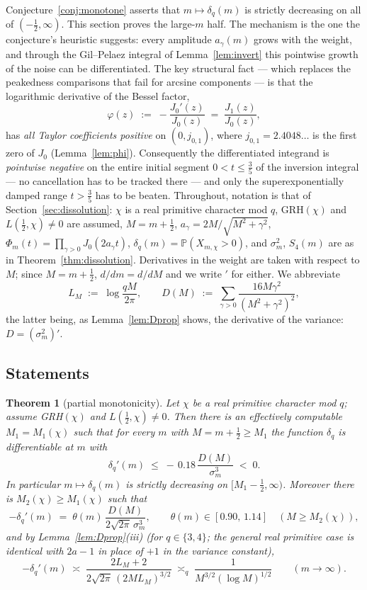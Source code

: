 \documentclass[11pt]{article}
\newtheorem{theorem}{Theorem}
\begin{document}
Conjecture~\ref{conj:monotone} asserts that $m\mapsto\delta_q(m)$ is
strictly decreasing on all of $(-\tfrac12,\infty)$. This section proves
the large-$m$ half. The mechanism is the one the conjecture's
heuristic suggests: every amplitude $a_\gamma(m)$ grows with the
weight, and through the Gil--Pelaez integral of
Lemma~\ref{lem:invert} this pointwise growth of the noise can be
differentiated. The key structural fact --- which replaces the
peakedness comparisons that fail for arcsine components --- is that
the logarithmic derivative of the Bessel factor,
\[
\varphi(z)\;:=\;-\frac{J_0'(z)}{J_0(z)}\;=\;\frac{J_1(z)}{J_0(z)},
\]
has \emph{all Taylor coefficients positive} on $(0,j_{0,1})$, where
$j_{0,1}=2.4048\ldots$ is the first zero of $J_0$
(Lemma~\ref{lem:phi}). Consequently the differentiated integrand is
\emph{pointwise negative} on the entire initial segment
$0<t\le\tfrac35$ of the inversion integral --- no cancellation has to
be tracked there --- and only the superexponentially damped range
$t>\tfrac35$ has to be beaten. Throughout, notation is that of
Section~\ref{sec:dissolution}: $\chi$ is a real primitive character
mod $q$, GRH$(\chi)$ and $L(\tfrac12,\chi)\ne0$ are assumed,
$M=m+\tfrac12$, $a_\gamma=2M/\sqrt{M^2+\gamma^2}$,
$\Phi_m(t)=\prod_{\gamma>0}J_0(2a_\gamma t)$,
$\delta_q(m)=\mathbb P(X_{m,\chi}>0)$, and $\sigma_m^2$, $S_4(m)$ are
as in Theorem~\ref{thm:dissolution}. Derivatives in the weight are
taken with respect to $M$; since $M=m+\tfrac12$, $d/dm=d/dM$ and we
write $'$ for either. We abbreviate
\[
L_M\;:=\;\log\frac{qM}{2\pi},
\qquad
D(M)\;:=\;\sum_{\gamma>0}\frac{16M\gamma^2}{(M^2+\gamma^2)^2},
\]
the latter being, as Lemma~\ref{lem:Dprop} shows, the derivative of
the variance: $D=(\sigma_m^2)'$.

\subsection*{Statements}

\begin{theorem}[partial monotonicity]\label{thm:monotone-large}
Let $\chi$ be a real primitive character mod $q$; assume GRH$(\chi)$
and $L(\tfrac12,\chi)\ne0$. Then there is an effectively computable
$M_1=M_1(\chi)$ such that for every $m$ with $M=m+\tfrac12\ge M_1$ the
function $\delta_q$ is differentiable at $m$ with
\[
\delta_q'(m)\;\le\;-\,0.18\,\frac{D(M)}{\sigma_m^{3}}\;<\;0 .
\]
In particular $m\mapsto\delta_q(m)$ is strictly decreasing on
$[M_1-\tfrac12,\infty)$. Moreover there is $M_2(\chi)\ge M_1(\chi)$
such that
\[
-\delta_q'(m)\;=\;\theta(m)\,\frac{D(M)}{2\sqrt{2\pi}\,\sigma_m^{3}},
\qquad \theta(m)\in[0.90,\,1.14]\quad(M\ge M_2(\chi)),
\]
and by Lemma~\ref{lem:Dprop}(iii) (for $q\in\{3,4\}$; the general
real primitive case is identical with $2a-1$ in place of $+1$ in the
variance constant),
\[
-\delta_q'(m)\;\asymp\;\frac{2L_M+2}{2\sqrt{2\pi}\,(2ML_M)^{3/2}}
\;\asymp_q\;\frac{1}{M^{3/2}(\log M)^{1/2}}
\qquad(m\to\infty).
\]
\end{theorem}
\end{document}
